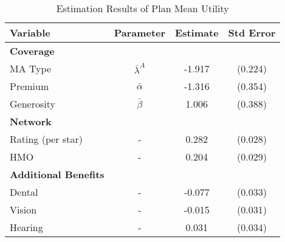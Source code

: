 \begin{table}[htbp]\footnotesize
  \caption{Estimation Results of Plan Mean Utility}
  \label{tab:demand_result_2}
  \centering
  \begin{tabular}{lccc}
  \toprule
  \textbf{Variable} & \textbf{Parameter} & \textbf{Estimate} & \textbf{Std Error} \\
  \midrule
  \textbf{Coverage} & & & \\
  MA Type & $\bar{\lambda}^{A}$ & -1.917 & (0.224) \\
  Premium & $\bar{\alpha}$ & -1.316 & (0.354) \\
  Generosity & $\bar{\beta}$ & 1.006 & (0.388) \\
  \midrule
  \textbf{Network} & & \\
  Rating (per star) & -  & 0.282 & (0.028) \\
  HMO & - & 0.204 & (0.029) \\
  \midrule
  \textbf{Additional Benefits} & & &\\
  Dental  & - & -0.077 & (0.033) \\
  Vision  & - & -0.015 & (0.031) \\
  Hearing  & - & 0.031 & (0.034) \\
  \bottomrule
  \end{tabular}
\end{table}